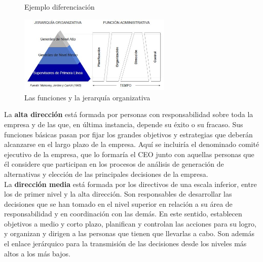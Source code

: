 \documentclass[12pt]{article}
\theoremstyle{definition_wo_parentheses}
\begin{document}
\begin{figure}[H]
 \centering
 \caption{Ejemplo diferenciación}
 \label{f:dif}
\end{figure}

\begin{figure}[H]
\centering
\includegraphics[width=0.65\textwidth]{jerarquia}
\caption{Las funciones y la jerarquía organizativa}
\label{fig:jerarquia}
\end{figure}

La \textbf{alta dirección} está formada por personas con responsabilidad sobre toda la empresa y de las que, en última instancia, depende su éxito o su fracaso. Sus funciones básicas pasan por fijar los grandes objetivos y estrategias que deberán alcanzarse en el largo plazo de la empresa. Aquí se incluiría el denominado comité ejecutivo de la empresa, que lo formaría el CEO junto con aquellas personas que él considere que participan en los procesos de análisis de generación de alternativas y elección de las principales decisiones de la empresa.\\

La \textbf{dirección media} está formada por los directivos de una escala inferior, entre los de primer nivel y la alta dirección. Son responsables de desarrollar las decisiones que se han tomado en el nivel superior en relación a su área de responsabilidad y en coordinación con las demás. En este sentido, establecen objetivos a medio y corto plazo, planifican y controlan las acciones para su logro, y organizan y dirigen a las personas que tienen que llevarlas a cabo. Son además el enlace jerárquico para la transmisión de las decisiones desde los niveles más altos a los más bajos.\\
\end{document}
